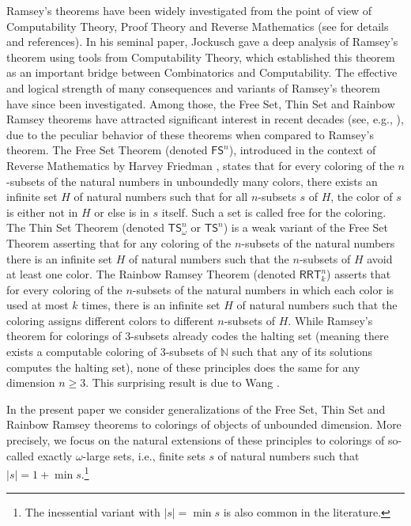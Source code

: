 \documentclass[10pt,a4paper]{article}
\newcommand{\RRT}[0]{\mathsf{RRT}}
\newcommand{\FS}[0]{\mathsf{FS}}
\newcommand{\TS}[0]{\mathsf{TS}}
\newcommand{\NN}[0]{\mathbb{N}}
\numberwithin{theorem}{section}
\begin{document}
Ramsey's theorems have been widely investigated from the point of view of Computability Theory, Proof Theory and Reverse Mathematics (see \cite{hirschfeldt2015slicing} for details and references).
In his seminal paper, Jockusch \cite{JockuschRamsey_1972} gave a deep analysis of Ramsey's theorem using tools from Computability Theory, which established this theorem as an important bridge between Combinatorics and Computability.
The effective and logical strength of many consequences and variants of Ramsey's theorem have since been investigated. Among those, the Free Set, Thin Set and Rainbow Ramsey theorems have attracted significant interest in recent decades (see, e.g., \cite{Cholak_Giusto_Hirst_Jockusch_2005, wang2014some, Pat:16, cholak2020thin, Liu2022-LIUTRM}), due to the peculiar behavior of these theorems when compared to Ramsey's theorem.
The Free Set Theorem (denoted $\FS^n$), introduced in the context of Reverse Mathematics by Harvey Friedman \cite{Fri-Sim:00}, states that for every coloring of the $n$-subsets of the natural numbers in unboundedly many colors, there exists an infinite set $H$ of natural numbers such that for all $n$-subsets $s$ of $H$, the color of $s$ is either not in $H$ or else is in $s$ itself. Such a set is called free for the coloring. The Thin Set Theorem (denoted $\TS^n_\omega$ or $\TS^n$) is a weak variant of the Free Set Theorem asserting that for any coloring of the $n$-subsets of the natural numbers there is an infinite set $H$ of natural numbers such that the $n$-subsets of $H$ avoid at least one color. The Rainbow Ramsey Theorem (denoted $\RRT^n_k$) asserts that for every coloring of the $n$-subsets of the natural numbers in which each color is used at most $k$ times, there is an infinite set $H$ of natural numbers such that the coloring assigns different colors to different $n$-subsets of $H$. 
While Ramsey's theorem for colorings of $3$-subsets already codes the halting set (meaning there exists a computable coloring of $3$-subsets of $\NN$ such that any of its solutions computes the halting set), none of these principles does the same for any dimension $n\geq 3$. This surprising result is due to Wang \cite{wang2014some}. 

In the present paper we consider generalizations of the Free Set, Thin Set and Rainbow Ramsey theorems to colorings of objects of unbounded dimension. More precisely, we focus on the natural extensions of these principles to colorings of so-called exactly $\omega$-large sets, i.e., finite sets $s$ of natural numbers such that $|s|=1+\min s$.\footnote{The inessential variant with $|s|=\min s$ is also common in the literature.} 
\end{document}
